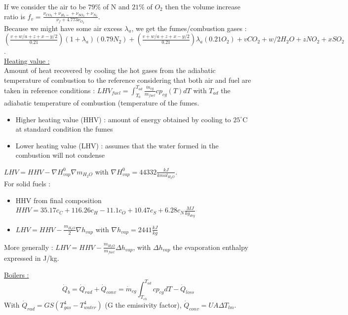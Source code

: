 \documentclass[../main.tex]{subfiles}
\begin{document}
If we consider the air to be $79\%$ of N and $21\%$ of $O_2$ then the volume increase ratio is $f_v = \frac{\nu_{CO_2} + \nu_{H_2=} + \nu_{SO_2} + \nu_{N_2}}{\nu_f + 4.773 \nu_{O_2}}$.\\
Because we might have some air excess $\lambda_a$, we get the fumes/combustion gases : $(\frac{v + w/a + z+x- y/2}{0.21}) (1+\lambda_a) (0.79 N_2) + (\frac{v + w/a + z+x- y/2}{0.21}) \lambda_a (0.21 O_2) + vCO_2 + w/2 H_2O + zNO_2 + xSO_2$.\\

\quad \underline{Heating value :}\\
Amount of heat recovered by cooling the hot gases from the adiabatic temperature of combustion to the reference considering that both air and fuel are taken in reference conditions : $LHV_{fuel} = \int_{T_0}^{T_{ad}} \frac{\dot{m}_{cg}}{\dot{m}_{fuel}} cp_{cg} (T) dT$ with $T_{ad}$ the adiabatic temperature of combustion (temperature of the fumes.\\

\begin{itemize}
    \item Higher heating value (HHV) : amount of energy obtained by cooling to $25^\circ$C at standard condition the fumes
    \item Lower heating value (LHV) : assumes that the water formed in the combustion will not condense
\end{itemize}

$LHV = HHV - \nabla H_{vap}^0 \nabla m_{H_2O}$ with $\nabla H_{vap}^0 = 44332 \frac{kJ}{kmol_{H_2O}}$.\\

For solid fuels : \begin{itemize}
    \item HHV from final composition $HHV = 35.17 c_C + 116.26 c_H - 11.1 c_O + 10.47 c_S + 6.28 c_N \frac{MJ}{kg_{dry}}$
    \item $LHV = HHV - \frac{m_{H_2O}}{2} \nabla h_{vap}$ with $\nabla h_{vap} = 2441 \frac{kJ}{kg}$
\end{itemize}

\warning More generally : $LHV = HHV - \frac{m_{H_2O}}{m_{fuel}} \Delta h_{vap}$, with $\Delta h_{vap}$ the evaporation enthalpy expressed in J/kg.

\quad \underline{Boilers :}\\
\begin{equation}
    \dot{Q}_b = \dot{Q}_{rad} + \dot{Q}_{conv} = \dot{m}_{cg} \int_{T_{ch}}^{T_{ad}} cp_{cg} dT - \dot{Q}_{loss}
\end{equation}
With $\dot{Q}_{rad} = GS (T_{gas}^4 - T_{water}^4)$ (G the emissivity factor), $\dot{Q}_{conv} = UA \Delta T_{lm}$.\\
\end{document}
